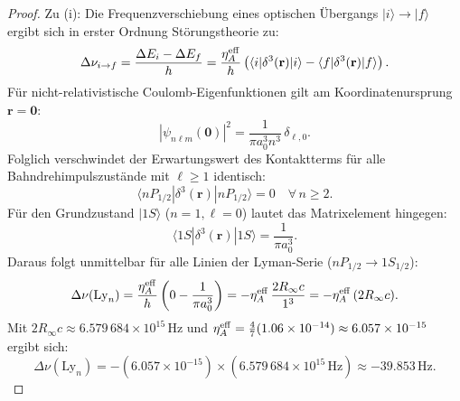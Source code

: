 \begin{proof}
Zu (i): Die Frequenzverschiebung eines optischen Übergangs $|i\rangle \to |f\rangle$ ergibt sich in erster Ordnung Störungstheorie zu:
\begin{equation}
    \Delta\nu_{i \to f} = \frac{\Delta E_i - \Delta E_f}{h} = \frac{\eta_A^{\rm eff}}{h} \left( \langle i | \delta^3(\mathbf{r}) | i \rangle - \langle f | \delta^3(\mathbf{r}) | f \rangle \right).
\end{equation}
Für nicht-relativistische Coulomb-Eigenfunktionen gilt am Koordinatenursprung $\mathbf{r} = \mathbf{0}$:
\begin{equation}
    |\psi_{n\ell m}(\mathbf{0})|^2 = \frac{1}{\pi a_0^3 n^3} \, \delta_{\ell, 0}.
\end{equation}
Folglich verschwindet der Erwartungswert des Kontaktterms für alle Bahndrehimpulszustände mit $\ell \ge 1$ identisch:
\begin{equation}
    \langle nP_{1/2} | \delta^3(\mathbf{r}) | nP_{1/2} \rangle = 0 \quad \forall \, n \ge 2.
\end{equation}
Für den Grundzustand $|1S\rangle$ ($n=1, \ell=0$) lautet das Matrixelement hingegen:
\begin{equation}
    \langle 1S | \delta^3(\mathbf{r}) | 1S \rangle = \frac{1}{\pi a_0^3}.
\end{equation}
Daraus folgt unmittelbar für alle Linien der Lyman-Serie ($nP_{1/2} \to 1S_{1/2}$):
\begin{equation}
    \Delta\nu(\text{Ly}_n) = \frac{\eta_A^{\rm eff}}{h} \left( 0 - \frac{1}{\pi a_0^3} \right) = -\eta_A^{\rm eff} \, \frac{2 R_\infty c}{1^3} = -\eta_A^{\rm eff} \, (2 R_\infty c).
\end{equation}
Mit $2 R_\infty c \approx 6.579\,684 \times 10^{15}\,\text{Hz}$ und $\eta_A^{\rm eff} = \frac{4}{7}(1.06 \times 10^{-14}) \approx 6.057 \times 10^{-15}$ ergibt sich:
\begin{equation}
    \Delta\nu(\text{Ly}_n) = - (6.057 \times 10^{-15}) \times (6.579\,684 \times 10^{15}\,\text{Hz}) \approx -39.853\,\text{Hz}.
\end{equation}


\end{proof}
